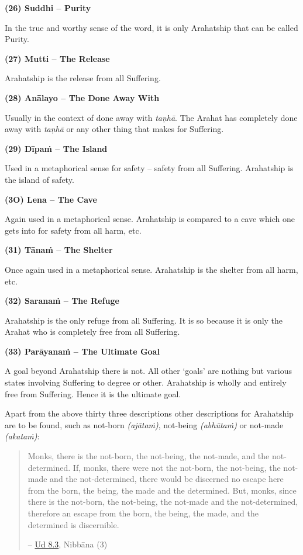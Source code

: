 \textbf{(26) Suddhi -- Purity}

\label{ch-13-suddhi}In the true and worthy sense of the word, it is only Arahatship that can be called Purity.

\textbf{(27) Mutti -- The Release}

Arahatship is the release from all Suffering.

\textbf{(28) Anālayo -- The Done Away With}

Usually in the context of done away with \emph{taṇhā}. The Arahat has completely done away with \emph{taṇhā} or any other thing that makes for Suffering.

\textbf{(29) Dīpaṁ -- The Island}

Used in a metaphorical sense for safety -- safety from all Suffering. Arahatship is the island of safety.

\textbf{(3O) Lena -- The Cave}

Again used in a metaphorical sense. Arahatship is compared to a cave which one gets into for safety from all harm, etc.

\textbf{(31) Tānaṁ -- The Shelter}

Once again used in a metaphorical sense. Arahatship is the shelter from all harm, etc.

\textbf{(32) Saranaṁ -- The Refuge}

Arahatship is the only refuge from all Suffering. It is so because it is only the Arahat who is completely free from all Suffering.

\textbf{(33) Parāyanaṁ -- The Ultimate Goal}

A goal beyond Arahatship there is not. All other `goals' are nothing but various states involving Suffering to  degree or other. Arahatship is wholly and entirely free from Suffering. Hence it is the ultimate goal.

\sectionBreak

Apart from the above thirty three descriptions other descriptions for Arahatship are to be found, such as not-born \emph{(ajātaṁ)}, not-being \emph{(abhūtaṁ)} or not-made \emph{(akataṁ)}:

\begin{quote}
Monks, there is the not-born, the not-being, the not-made, and the not-determined. If, monks, there were not the not-born, the not-being, the not-made and the not-determined, there would be discerned no escape here from the born, the being, the made and the determined. But, monks, since there is the not-born, the not-being, the not-made and the not-determined, therefore an escape from the born, the being, the made, and the determined is discernible.

-- \href{https://suttacentral.net/ud8.3/en/anandajoti}{Ud 8.3}, Nibbāna (3)
\end{quote}

